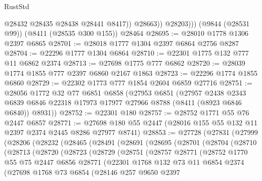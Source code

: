 \begin{lexlean}{RustStd}
\begin{coremodule}
                  @28432
                  @28435
                  @28438
                  @28441
                  @8417))
              @28663))
          @28203)))
    (@9844 (@28531 @99))
    (@8411 (@28535 @300 @155))
    @28464
@28695 := @28010 @1778 @1306 @2397 @6865
@28701 := @28018 @1777 @1304 @2397 @6864 @2756 @8287
@28704 := @22296 @1777 @1304 @6864
@28710 := @22301 @1775 @132 @777 @11 @6862 @2374
@28713 := @27698 @1775 @777 @6862
@28720 := @28039 @1774 @1855 @777 @2397 @6860 @2167 @1863
@28723 := @22296 @1774 @1855 @6860
@28729 := @22302 @1773 @777 @1854 @2604 @6859 @27716
@28751 := @28056
    @1772
    @32
    @77
    @6851
    @6858
    (@27953
      @6851
      (@27957
        @2438
        @2343
        @6839
        @6846
        @22318
        @17973
        @17977
        @27966
        @8788
        (@8411 (@8923 @6846 @6840))
        @8931))
@28752 := @22301 @180
@28757 := @28752 @1771 @55 @76 @2447 @6857
@28771 := @27698 @180 @55 @2447 (@28016 @155 @55 @132 @11 @2397 @2374 @2445 @8286 @27977 @8741)
@28853 := @27728
    (@27831
      (@27999
        (@28206
          (@28232
            (@28465
              (@28491
                (@28691
                  (@28695
                    (@28701
                      (@28704
                        (@28710
                          (@28713
                            (@28720
                              (@28723
                                (@28729
                                  (@28751
                                    (@28757
                                      @28771
                                      (@28752
                                        @1770
                                        @55
                                        @75
                                        @2447
                                        @6856
                                        @28771
                                        (@22301
                                          @1768
                                          @132
                                          @73
                                          @11
                                          @6854
                                          @2374
                                          (@27698
                                            @1768
                                            @73
                                            @6854
                                            (@28146
                                              @257
                                              @9650
                                              @2397

\end{coremodule}
\end{lexlean}
